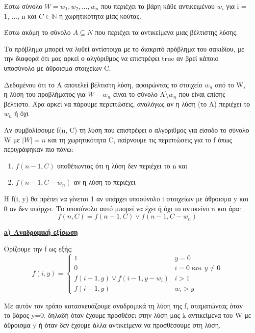 \documentclass[12pt]{article}
\begin{document}
    Έστω σύνολο  $W = {w_1, w_2, ..., w_n}$ που περιέχει τα βάρη κάθε αντικειμένου $w_i$ για i = 1, ..., n
    και $C\in\mathbb{N}$ η χωρητικότητα μίας κούτας.

    Έστω ακόμη το σύνολο $A \subseteq N$ που περιέχει τα αντικείμενα μιας βέλτιστης λύσης.

    Το πρόβλημα μπορεί να λυθεί αντίστοιχα με το διακριτό πρόβλημα του σακιδίου, με την διαφορά 
    ότι μας αρκεί ο αλγόριθμος να επιστρέφει true αν βρεί κάποιο υποσύνολο με άθροισμα στοιχείων C.

    Δεδομένου ότι το Α αποτελεί βέλτιστη λύση, αφαιρώντας το στοιχείο $w_n$ από το W, η λύση του 
    προβλήματος για $W-{w_n}$ είναι το σύνολο Α\textbackslash${w_n}$ που είναι επίσης βέλτιστο.
    Άρα αρκεί να πάρουμε περιπτώσεις, αναλόγως αν η λύση (το Α) περιέχει το $w_n$ ή όχι
        
    Αν συμβολίσουμε f(n, C) τη λύση που επιστρέφει ο αλγόριθμος για είσοδο το σύνολο W με $|W|=n$ και τη χωρητικότητα C,
    παίρνουμε τις περιπτώσεις για το f όπως περιγράφηκαν πιο πάνω:
    \begin{enumerate}
        \item $f(n-1, C)$ υποθέτωντας ότι η λύση δεν περιέχει το n και
        \item $f(n-1, C-w_n)$ αν η λύση το περιέχει
    \end{enumerate} 

    Η f(i, y) θα πρέπει να γίνεται 1 αν υπάρχει υποσύνολο i στοιχείων με άθροισμα y και 0 αν δεν υπάρχει. 
    Το υποσύνολο αυτό μπορεί να έχει ή όχι το αντικείνο n και άρα:
    \[f(n,C) = f(n-1, C) \lor f(n-1, C - w_n)\]

    \begin{flushleft} \underline{\textbf{a) Αναδρομική εξίσωση}} \end{flushleft}  

    Ορίζουμε την f ως εξής:
    \[ f(i, y) =\begin{cases} 
                1 & y = 0 \\
                0 & i = 0 \text{ και } y \neq 0 \\
                f(i-1, y) \lor f(i-1, y - w_i) & i>1\\
                f(i-1, y) & w_i > y 
                \end{cases}
    \]
    \vspace{5mm}

    Με αυτόν τον τρόπο κατασκευάζουμε αναδρομικά τη λύση της f, σταματώντας όταν το βάρος y=0, δηλαδή όταν έχουμε προσθέσει στην λύση μας k αντικείμενα του W με άθροισμα y ή όταν δεν έχουμε 
    άλλα αντικείμενα να προσθέσουμε στη λύση.
\end{document}
